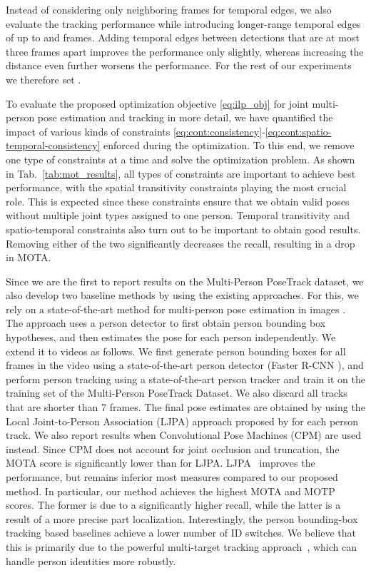 \documentclass[10pt,twocolumn,letterpaper]{article}
\begin{document}
Instead of considering only neighboring frames for temporal edges, we also evaluate the tracking performance while introducing longer-range temporal edges of up to  and  frames.
Adding temporal edges between detections that are at most three frames  apart improves the performance only slightly, whereas increasing the distance even further  worsens the performance. For the rest of our experiments we therefore set . 

To evaluate the proposed optimization objective \eqref{eq:ilp_obj} for joint multi-person pose estimation and tracking in more detail, we have quantified the impact of various kinds of constraints \eqref{eq:cont:consistency}-\eqref{eq:cont:spatio-temporal-consistency} enforced during the optimization. To this end, we remove one type of constraints at a time and solve the optimization problem. As shown in Tab.~\ref{tab:mot_results}, all types of constraints are important to achieve best performance, with the spatial transitivity constraints playing the most crucial role. This is expected since these constraints ensure that we obtain valid poses without multiple joint types assigned to one person.    
Temporal transitivity and spatio-temporal constraints also turn out to be important to obtain good results. Removing either of the two significantly decreases the recall, resulting in a drop in MOTA. 

Since we are the first to report results on the Multi-Person PoseTrack dataset, we also develop two baseline methods by using the existing approaches. For this, we rely on a state-of-the-art method for multi-person pose estimation in images \cite{Iqbal_ECCVw2016}. The approach uses a person detector \cite{ren2015faster} to first obtain person bounding box hypotheses, and then estimates the pose for each person independently. We extend it to videos as follows. We first generate person bounding boxes for all frames in the video using a state-of-the-art person detector (Faster R-CNN \cite{ren2015faster}), and perform person tracking using a state-of-the-art person tracker \cite{tang-2016} and train it on the training set of the Multi-Person PoseTrack Dataset. We also discard all tracks that are shorter than 7 frames. The final pose estimates are obtained by using the Local Joint-to-Person Association (LJPA) approach proposed by \cite{Iqbal_ECCVw2016} for each person track. We also report results when Convolutional Pose Machines (CPM) \cite{wei2016convolutional} are used instead. 
Since CPM does not account for joint occlusion and truncation, the MOTA score is significantly lower than for LJPA. LJPA~\cite{Iqbal_ECCVw2016} improves the performance, but remains inferior \wrt most measures compared to our proposed method. In particular, our method achieves the highest MOTA and MOTP scores. The former is due to a significantly higher recall, while the latter is a result of a more precise part localization. Interestingly, the person bounding-box tracking based baselines achieve a lower number of ID switches. We believe that this is primarily due to the powerful multi-target tracking approach~\cite{tang-2016}, which can handle person identities more robustly.
\end{document}
